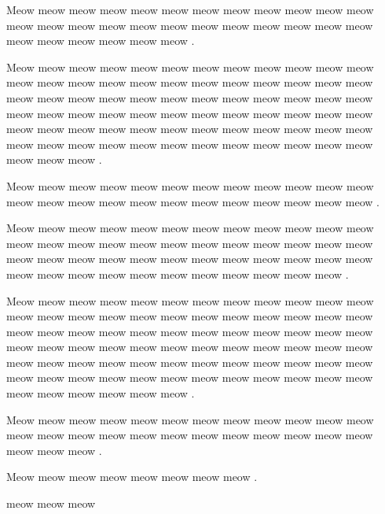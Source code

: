 \documentclass[12pt, a5paper, openany]{book}
\begin{document}
Meow meow meow meow meow meow meow meow meow meow meow meow meow meow meow meow meow meow meow meow meow meow meow meow meow meow meow meow meow meow .

Meow meow meow meow meow meow meow meow meow meow meow meow meow meow meow meow meow meow meow meow meow meow meow meow meow meow meow meow meow meow meow meow meow meow meow meow meow meow meow meow meow meow meow meow meow meow meow meow meow meow meow meow meow meow meow meow meow meow meow meow meow meow meow meow meow meow meow meow meow meow meow meow meow meow meow .

Meow meow meow meow meow meow meow meow meow meow meow meow meow meow meow meow meow meow meow meow meow meow meow meow .

Meow meow meow meow meow meow meow meow meow meow meow meow meow meow meow meow meow meow meow meow meow meow meow meow meow meow meow meow meow meow meow meow meow meow meow meow meow meow meow meow meow meow meow meow meow meow meow .

Meow meow meow meow meow meow meow meow meow meow meow meow meow meow meow meow meow meow meow meow meow meow meow meow meow meow meow meow meow meow meow meow meow meow meow meow meow meow meow meow meow meow meow meow meow meow meow meow meow meow meow meow meow meow meow meow meow meow meow meow meow meow meow meow meow meow meow meow meow meow meow meow meow meow meow meow meow meow .

Meow meow meow meow meow meow meow meow meow meow meow meow meow meow meow meow meow meow meow meow meow meow meow meow meow meow meow .

Meow meow meow meow meow meow meow meow .





\cleardoublepage
\pagecolor{Green}
\mbox{}
\vfill
\begin{flushright}
 
meow meow meow 
 
\end{flushright}
\end{document}
